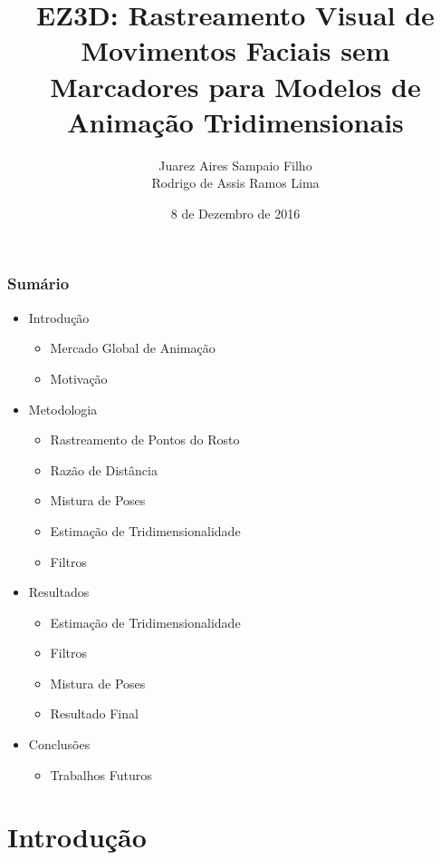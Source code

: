 \documentclass[brazil]{beamer}
\title{EZ3D: Rastreamento Visual de Movimentos Faciais sem Marcadores para Modelos de Animação Tridimensionais}
\author{Juarez Aires Sampaio Filho \\ Rodrigo de Assis Ramos Lima}
\institute{Universidade de Brasília}
\date{8 de Dezembro de 2016}
\begin{document}
\begin{frame}
        \titlepage
\end{frame}

\begin{frame}[fragile]
  \frametitle{Sumário}
  \begin{itemize}
     \item Introdução
     \begin{itemize}
     	\item Mercado Global de Animação
    	 	\item Motivação
   	 \end{itemize}
     \item Metodologia
     \begin{itemize}
    	 	\item Rastreamento de Pontos do Rosto
    	 	\item Razão de Distância
    	 	\item Mistura de Poses
    	 	\item Estimação de Tridimensionalidade
    	 	\item Filtros
   	 \end{itemize}
     \item Resultados
     \begin{itemize}
    	 	\item Estimação de Tridimensionalidade
    	 	\item Filtros
    	 	\item Mistura de Poses
    	 	\item Resultado Final
   	 \end{itemize}
     \item Conclusões
     \begin{itemize}
    	 	\item Trabalhos Futuros
   	 \end{itemize}
  \end{itemize}
\end{frame}


\section{Introdução}
%
%
%
%
\end{document}
